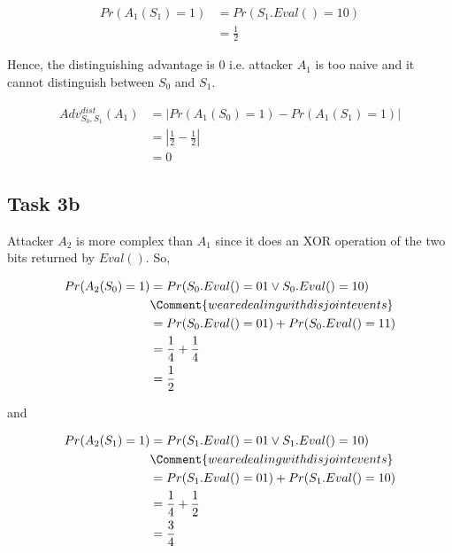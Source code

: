 \documentclass{article}
\begin{document}
    \begin{align*}
        Pr(A_1(S_1) = 1)    & = Pr(S_1.Eval() = 10) \\
                            & = \frac{1}{2}
    \end{align*}

    Hence, the distinguishing advantage is 0 i.e. attacker $A_1$ is too naive and it cannot distinguish between $S_0$ and $S_1$.

    \begin{align*}
        Adv_{S_0,S_1}^{dist}(A_1)   & = |Pr(A_1(S_0) = 1) - Pr(A_1(S_1) = 1)| \\
                                    & = |\frac{1}{2} - \frac{1}{2}| \\
                                    & = 0
    \end{align*}

    \subsection*{Task 3b}
    Attacker $A_2$ is more complex than $A_1$ since it does an XOR operation of the two bits returned by $Eval()$. So,

    \begin{align*}
        Pr(A_2(S_0) = 1)    & = Pr(S_0.Eval() = 01 \lor S_0.Eval() = 10) \\
                            & \Comment{we are dealing with disjoint events} \\
                            & = Pr(S_0.Eval() = 01) + Pr(S_0.Eval() = 11) \\
                            & = \frac{1}{4} + \frac{1}{4} \\
                            & = \frac{1}{2}
    \end{align*}

    and

    \begin{align*}
        Pr(A_2(S_1) = 1)    & = Pr(S_1.Eval() = 01 \lor S_1.Eval() = 10) \\
                            & \Comment{we are dealing with disjoint events} \\
                            & = Pr(S_1.Eval() = 01) + Pr(S_1.Eval() = 10) \\
                            & = \frac{1}{4} + \frac{1}{2} \\
                            & = \frac{3}{4}
    \end{align*}
\end{document}
